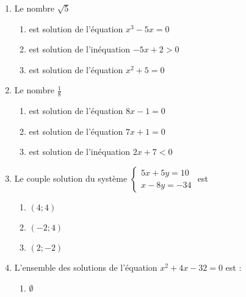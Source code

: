 \documentclass[oneside,twoside]{book}
\begin{document}
\begin{enumerate}
\item Le nombre $\sqrt{5}$

\begin{enumerate}


\item\BonneReponse est solution de l'équation $x^{3}-5x=0$

\item\MauvaiseReponse est solution de l'inéquation $-5x+2>0$
\item\MauvaiseReponse est solution de l'équation $x^{2}+5=0$

\end{enumerate}



\item Le nombre $\frac{1}{8}$

\begin{enumerate}


\item\BonneReponse est solution de l'équation $8x-1=0$
\item\MauvaiseReponse est solution de l'équation $7x+1=0$

\item\MauvaiseReponse est solution de l'inéquation $2x+7<0$

\end{enumerate}


\newpage

\item Le couple solution du système $\left\{\begin{array}{c}5x+5y=10 \\ x-8y=-34\end{array}\right.$ est

\begin{enumerate}

\item\MauvaiseReponse $(4;4)$

\item\BonneReponse $(-2 ;4)$
\item\MauvaiseReponse $(2 ; -2)$


\end{enumerate}



\item L'ensemble des solutions de l'équation $x^{2}+4 x-32=0$ est :

\begin{enumerate}

\item\MauvaiseReponse $\emptyset$


\end{enumerate}
\end{enumerate}
\end{document}
